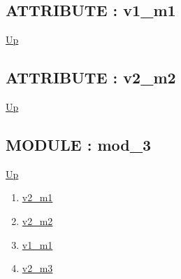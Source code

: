 \subsection*{ATTRIBUTE : v1\_m1}
\hypertarget{ecldoc:intest.inintest.example_2.mod_2.v1_m1}{}
\par
\begin{minipage}[t]{\textwidth}
\begin{flushleft}
  
\end{flushleft}
\end{minipage}
\hyperlink{ecldoc:intest.inintest.example_2.mod_2}{Up} \\
\par
\par
\subsection*{ATTRIBUTE : v2\_m2}
\hypertarget{ecldoc:intest.inintest.example_2.mod_2.v2_m2}{}
\par
\begin{minipage}[t]{\textwidth}
\begin{flushleft}
  
\end{flushleft}
\end{minipage}
\hyperlink{ecldoc:intest.inintest.example_2.mod_2}{Up} \\
\par
\par

\subsection*{MODULE : mod\_3}
\hypertarget{ecldoc:intest.inintest.example_2.mod_3}{}
\par
\begin{minipage}[t]{\textwidth}
\begin{flushleft}
  
\end{flushleft}
\end{minipage}
\hyperlink{ecldoc:intest.inintest.example_2}{Up} \\
\par
\par
\begin{enumerate}
\item \hyperlink{ecldoc:intest.inintest.example_2.mod_1.v2_m1}{v2\_m1}
\item \hyperlink{ecldoc:intest.inintest.example_2.mod_2.v2_m2}{v2\_m2}
\item \hyperlink{ecldoc:intest.inintest.example_2.mod_3.v1_m1}{v1\_m1}
\item \hyperlink{ecldoc:intest.inintest.example_2.mod_3.v2_m3}{v2\_m3}
\end{enumerate}
